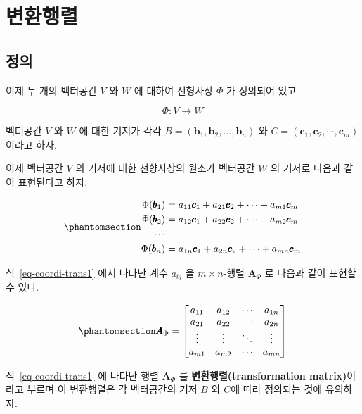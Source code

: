 \documentclass[
  11pt,
  a4paper,
  oneside]{scrbook}
\theoremstyle{definition}
\theoremstyle{definition}
\theoremstyle{plain}
\theoremstyle{remark}
\begin{document}
\section{변환행렬}\label{uxbcc0uxd658uxd589uxb82c}

\subsection{정의}\label{uxc815uxc758}

이제 두 개의 벡터공간 \(V\) 와 \(W\) 에 대하여 선형사상 \(\Phi\) 가
정의되어 있고

\[ \Phi : V \rightarrow W \]

벡터공간 \(V\) 와 \(W\) 에 대한 기저가 각각
\(B=(\pmb b_1, \pmb b_2, \dots, \pmb b_n)\) 와
\(C = (\pmb c_1, \pmb c_2, \cdots, \pmb c_m)\) 이라고 하자.

이제 벡터공간 \(V\) 의 기저에 대한 선향사상의 원소가 벡터공간 \(W\) 의
기저로 다음과 같이 표현된다고 하자.

\begin{equation}\phantomsection\label{eq-coordi-trans1}{ 
\begin{aligned}
\Phi(\pmb b_1) &= a_{11} \pmb c_1 + a_{21} \pmb c_2 + \cdots + a_{m1} \pmb c_m \\
\Phi(\pmb b_2) &= a_{12} \pmb c_1 + a_{22} \pmb c_2 + \cdots + a_{m2} \pmb c_m \\
\cdots \\
\Phi(\pmb b_n) &= a_{1n} \pmb c_1 + a_{2n} \pmb c_2 + \cdots + a_{mn} \pmb c_m \\
\end{aligned}
}\end{equation}

식~\ref{eq-coordi-trans1} 에서 나타난 계수 \(a_{ij}\) 을
\(m \times n\)-행렬 \(\pmb A_{\Phi}\) 로 다음과 같이 표현할 수 있다.

\begin{equation}\phantomsection\label{eq-coordi-trans2}{
\pmb A_{\Phi} =
\begin{bmatrix}
a_{11} & a_{12} & \cdots & a_{1n} \\
a_{21} & a_{22} & \cdots & a_{2n} \\
\vdots & \vdots & \ddots & \vdots \\
a_{m1} & a_{m2} & \cdots & a_{mn} \\
\end{bmatrix}
}\end{equation}

식~\ref{eq-coordi-trans1} 에 나타난 행렬 \(\pmb A_{\Phi}\) 를
\textbf{변환행렬(transformation matrix)}이라고 부르며 이 변환행렬은 각
벡터공간의 기저 \(B\) 와 \(C\)에 따라 정의되는 것에 유의하자.
\end{document}

